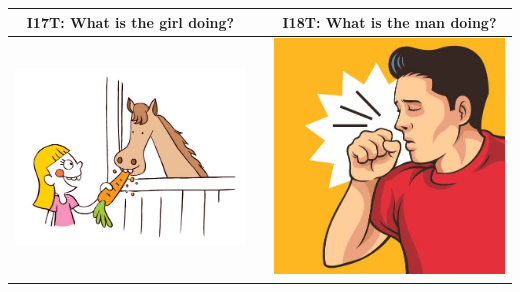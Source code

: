 \documentclass[12pt,notitlepage]{article}
\begin{document}
\begin{center}
\begin{tabular}{|c|c|c|}
\hline
I17T: What is the girl doing? && I18T: What is the man doing? \\
\hline
\includegraphics[width=20em,trim=0 0 0 -3]{figures/I17.jpg} & & \includegraphics[width=20em,trim=0 0 0 -3]{figures/I18.jpg} \\
\hline
\end{tabular}
\vspace{1em} \\



\end{center}
\end{document}
